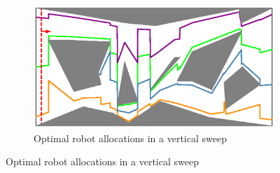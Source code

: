 \begin{figure}[t]
\vspace{1.5mm}
    \centering

    \begin{subfigure}[t]{0.7\textwidth}
         \centering
         \includegraphics[width=\textwidth]{chapters/sc/fig/instance_2.eps}
         \caption{Optimal robot allocations in a vertical sweep}
         \label{fig:sc-vertical}
     \end{subfigure}
    
    \medskip
    

\end{figure}
